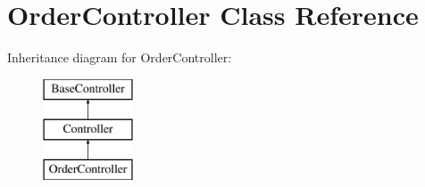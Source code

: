 \hypertarget{class_responsive_1_1_http_1_1_controllers_1_1_order_controller}{}\section{Order\+Controller Class Reference}
\label{class_responsive_1_1_http_1_1_controllers_1_1_order_controller}
Inheritance diagram for Order\+Controller\+:\begin{figure}[H]
\begin{center}
\leavevmode
\includegraphics[height=3.000000cm]{class_responsive_1_1_http_1_1_controllers_1_1_order_controller}
\end{center}
\end{figure}
